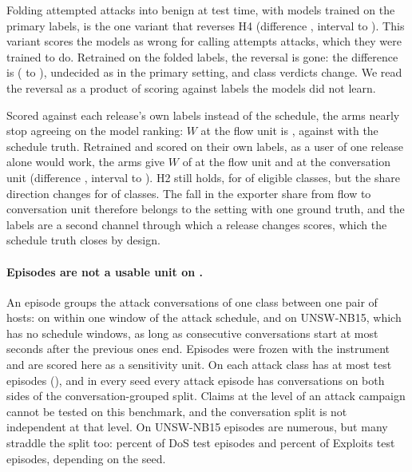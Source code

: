 Folding attempted attacks into benign at test time, with models trained on the primary labels, is the one variant that reverses H4 (difference \RQfourFoldScoreDiff{}, interval \RQfourFoldScoreDiffLo{} to \RQfourFoldScoreDiffHi{}). This variant scores the models as wrong for calling attempts attacks, which they were trained to do. Retrained on the folded labels, the reversal is gone: the difference is \RQfourFoldRetrDiff{} (\RQfourFoldRetrDiffLo{} to \RQfourFoldRetrDiffHi{}), undecided as in the primary setting, and \RQfourFoldRetrainedClasses{} class verdicts change. We read the reversal as a product of scoring against labels the models did not learn.

Scored against each release's own labels instead of the schedule, the arms nearly stop agreeing on the model ranking: $W$ at the flow unit is \RQfourOwnScoreWFlow{}, against \RQfourWFlow{} with the schedule truth. Retrained and scored on their own labels, as a user of one release alone would work, the arms give $W$ of \RQfourOwnRetrWFlow{} at the flow unit and \RQfourOwnRetrWConv{} at the conversation unit (difference \RQfourOwnRetrDiff{}, interval \RQfourOwnRetrDiffLo{} to \RQfourOwnRetrDiffHi{}). H2 still holds, for \RQfourOwnRetrHtwoAbove{} of \RQfourOwnRetrHtwoElig{} eligible classes, but the share direction changes for \RQfourOwnRetrKfive{} of \RQfourClassesOf{} classes. The fall in the exporter share from flow to conversation unit therefore belongs to the setting with one ground truth, and the labels are a second channel through which a release changes scores, which the schedule truth closes by design.

\paragraph{Episodes are not a usable unit on \cicids{}.} An episode groups the attack conversations of one class between one pair of hosts: on \cicids{} within one window of the attack schedule, and on UNSW-NB15, which has no schedule windows, as long as consecutive conversations start at most  seconds after the previous ones end. Episodes were frozen with the instrument and are scored here as a sensitivity unit. On \cicids{} each attack class has at most \RQfourEpisodeMax{} test episodes (\RQfourEpisodeMaxClass{}), and in every seed every attack episode has conversations on both sides of the conversation-grouped split. Claims at the level of an attack campaign cannot be tested on this benchmark, and the conversation split is not independent at that level. On UNSW-NB15 episodes are numerous, but many straddle the split too: \RQfourEpisodeStradDos{} percent of DoS test episodes and \RQfourEpisodeStradExploits{} percent of Exploits test episodes, depending on the seed.

